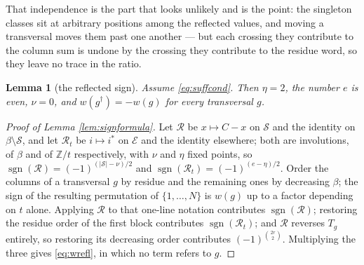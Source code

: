 \documentclass[11pt,reqno]{amsart}
\theoremstyle{plain}
\newtheorem{lemma}[theorem]{Lemma}
\theoremstyle{definition}
\newcommand{\ZZ}{\mathbb{Z}}
\newcommand{\sgn}{\operatorname{sgn}}
\begin{document}
\noindent That independence is the part that looks unlikely and is the point: the singleton classes
sit at arbitrary positions among the reflected values, and moving a transversal moves them past one
another --- but each crossing they contribute to the column sum is undone by the crossing they
contribute to the residue word, so they leave no trace in the ratio.

\begin{lemma}[the reflected sign]\label{lem:signrefl}
Assume \eqref{eq:suffcond}. Then $\eta=2$, the number $e$ is even, $\nu=0$, and
$w(g^{\dagger})=-w(g)$ for every transversal $g$.
\end{lemma}

\begin{proof}[Proof of Lemma \ref{lem:signformula}]
Let $\mathcal{R}$ be $x\mapsto C-x$ on $\mathcal{S}$ and the identity on
$\beta\setminus\mathcal{S}$, and let $\mathcal{R}_t$ be $i\mapsto i^{*}$ on $\mathcal{E}$ and the
identity elsewhere; both are involutions, of $\beta$ and of $\ZZ/t$ respectively, with $\nu$ and
$\eta$ fixed points, so $\sgn(\mathcal{R})=(-1)^{(|\mathcal{S}|-\nu)/2}$ and
$\sgn(\mathcal{R}_t)=(-1)^{(e-\eta)/2}$. Order the columns of a transversal $g$ by residue and the
remaining ones by decreasing $\beta$; the sign of the resulting permutation of $\{1,\dots,N\}$ is
$w(g)$ up to a factor depending on $t$ alone. Applying $\mathcal{R}$ to that one-line notation
contributes $\sgn(\mathcal{R})$; restoring the residue order of the first block contributes
$\sgn(\mathcal{R}_t)$; and $\mathcal{R}$ reverses $T_g$ entirely, so restoring its decreasing order
contributes $(-1)^{\binom{2r}{2}}$. Multiplying the three gives \eqref{eq:wrefl}, in which no term
refers to $g$.
\end{proof}
\end{document}
